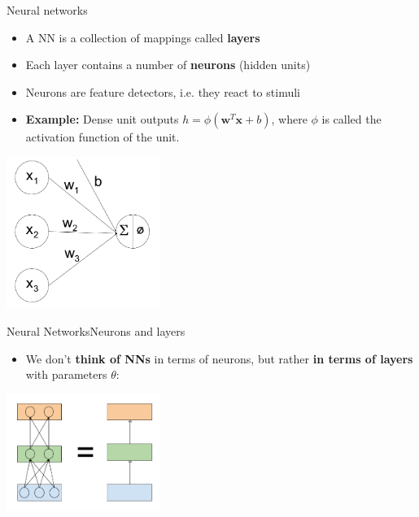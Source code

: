 \documentclass[handout]{beamer}
\theoremstyle{definition}
\theoremstyle{remark}
\newcommand*{\V}[1]{\mathbf{#1}}%
\begin{document}
\begin{frame}{Neural networks}
  \begin{itemize}
  \item{
    A NN is a collection of mappings called \textbf{layers}
    \pause
  }
  
  \item{
    Each layer contains a number of \textbf{neurons} (hidden units) 
    \pause
  }
  
  \item{
    Neurons are feature detectors, i.e. they react to stimuli 
    \pause
  }
  
  \item{
    \textbf{Example:} Dense unit outputs $h = \phi(\V{w}^T\V{x} + b)$, where $\phi$ is called the activation function of the unit.
    \pause
  }
  \end{itemize}
  
  \centering
  \includegraphics[width=5cm]{figs/neuron.png}
  
\end{frame}

\begin{frame}{Neural Networks}{Neurons and layers}
  \begin{itemize}
      \item We don't \textbf{think of NNs} in terms of neurons, but rather \textbf{in terms of layers} with parameters $\theta$: \pause
  \end{itemize}
  
  \centering
  \includegraphics[width=5cm]{figs/mlp.png}
\end{frame}
\end{document}
